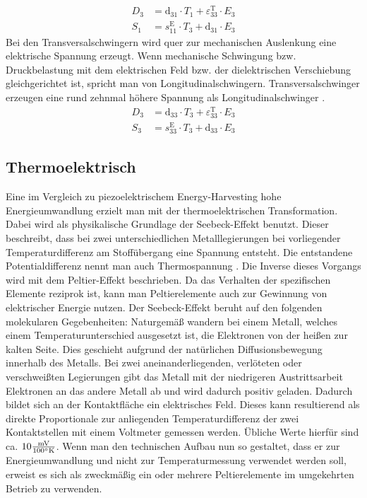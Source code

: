 \documentclass[11pt]{scrreprt} %
\begin{document}
\begin{align}
D_3 & =  \textrm{d}_{31} \cdot T_1 + \varepsilon_{33}^{\textrm{T}} \cdot E_3 \label{formel:3.3} \\
S_1 & =  s_{11}^{\textrm{E}} \cdot T_3 + \textrm{d}_{31} \cdot E_3 \label{formel:3.4}
\end{align}
Bei den Transversalschwingern wird quer zur mechanischen Auslenkung eine elektrische Spannung erzeugt. Wenn mechanische Schwingung bzw. Druckbelastung mit dem elektrischen Feld bzw. der dielektrischen Verschiebung gleichgerichtet ist, spricht man von Longitudinalschwingern. Transversalschwinger erzeugen eine rund zehnmal höhere Spannung als Longitudinalschwinger \citep[vgl. S.39]{Dembowski2011}.
\begin{align}
D_3 & =  \textrm{d}_{33} \cdot T_3 + \varepsilon_{33}^{\textrm{T}} \cdot E_3 \label{formel:3.5} \\
S_3 & =  s_{33}^{\textrm{E}} \cdot T_3 + \textrm{d}_{33} \cdot E_3 \label{formel:3.6}
\end{align}
\subsection{Thermoelektrisch}
Eine im Vergleich zu piezoelektrischem Energy-Harvesting hohe Energieumwandlung erzielt man mit der thermoelektrischen Transformation. Dabei wird als physikalische Grundlage der Seebeck-Effekt benutzt. Dieser beschreibt, dass bei zwei unterschiedlichen Metalllegierungen bei vorliegender Temperaturdifferenz am Stoffübergang eine Spannung entsteht. Die entstandene Potentialdifferenz nennt man auch Thermospannung \citep[vgl. S.158]{Schruefer2012}. Die Inverse dieses Vorgangs wird mit dem Peltier-Effekt beschrieben. Da das Verhalten der spezifischen Elemente reziprok ist, kann man Peltierelemente auch zur Gewinnung von elektrischer Energie nutzen. \newline
Der Seebeck-Effekt beruht auf den folgenden molekularen Gegebenheiten: Naturgemäß wandern bei einem Metall, welches einem Temperaturunterschied ausgesetzt ist, die Elektronen von der heißen zur kalten Seite. Dies geschieht aufgrund der natürlichen Diffusionsbewegung innerhalb des Metalls. Bei zwei aneinanderliegenden, verlöteten oder verschweißten Legierungen gibt das Metall mit der niedrigeren Austrittsarbeit Elektronen an das andere Metall ab und wird dadurch positiv geladen. Dadurch bildet sich an der Kontaktfläche ein elektrisches Feld. Dieses kann resultierend als direkte Proportionale zur anliegenden Temperaturdifferenz der zwei Kontaktstellen mit einem Voltmeter gemessen werden. Übliche Werte hierfür sind ca. $10  \frac{\textrm{mV}}{100 \degree \textrm{K}}$.\newline \newline
Wenn man den technischen Aufbau nun so gestaltet, dass er zur Energieumwandlung und nicht zur Temperaturmessung verwendet werden soll, erweist es sich als zweckmäßig ein oder mehrere Peltierelemente im umgekehrten Betrieb zu verwenden. \citep[vgl. S.30]{Dembowski2011}
\end{document}
